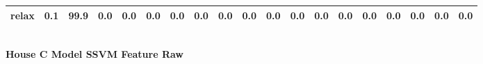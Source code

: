 \documentclass{article}
\begin{document}
\begin{sideways}
\begin{tabular}{lrrrrrrrrrrrrrrrrrr}
relax                         &         0.1 &               99.9 &           0.0 &                          0.0 &                0.0 &                0.0 &                        0.0 &          0.0 &              0.0 &                0.0 &                    0.0 &                      0.0 &                  0.0 &                   0.0 &              0.0 &              0.0 &                                  0.0 &          0.0 \\
\bottomrule
\end{tabular}
\end{sideways}
\normalsize
\vspace{1cm}\\
\textbf{House C Model SSVM Feature Raw}\\
\vspace{1cm}\\
\end{document}
